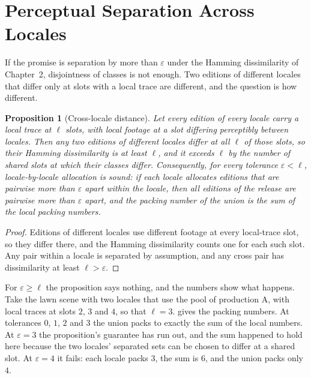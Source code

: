 \documentclass[11pt,twoside,openright]{book}
\theoremstyle{plain}
\newtheorem{proposition}[theorem]{Proposition}
\theoremstyle{definition}
\theoremstyle{remark}
\begin{document}
\section{Perceptual Separation Across Locales}\label{sec:sep11}

If the promise is separation by more than $\varepsilon$ under the Hamming dissimilarity of Chapter~2, disjointness of classes is not enough. Two editions of different locales that differ only at slots with a local trace are different, and the question is how different.

\begin{proposition}[Cross-locale distance]\label{prop:cross}
Let every edition of every locale carry a local trace at $\ell$ slots, with local footage at a slot differing perceptibly between locales. Then any two editions of different locales differ at all $\ell$ of those slots, so their Hamming dissimilarity is at least $\ell$, and it exceeds $\ell$ by the number of shared slots at which their classes differ. Consequently, for every tolerance $\varepsilon<\ell$, locale-by-locale allocation is sound: if each locale allocates editions that are pairwise more than $\varepsilon$ apart within the locale, then all editions of the release are pairwise more than $\varepsilon$ apart, and the packing number of the union is the sum of the local packing numbers.
\end{proposition}

\begin{proof}
Editions of different locales use different footage at every local-trace slot, so they differ there, and the Hamming dissimilarity counts one for each such slot. Any pair within a locale is separated by assumption, and any cross pair has dissimilarity at least $\ell>\varepsilon$.
\end{proof}

For $\varepsilon\ge\ell$ the proposition says nothing, and the numbers show what happens. Take the lawn scene with two locales that use the pool of production A, with local traces at slots $2$, $3$ and $4$, so that $\ell=3$.  gives the packing numbers. At tolerances $0$, $1$, $2$ and $3$ the union packs to exactly the sum of the local numbers. At $\varepsilon=3$ the proposition's guarantee has run out, and the sum happened to hold here because the two locales' separated sets can be chosen to differ at a shared slot. At $\varepsilon=4$ it fails: each locale packs $3$, the sum is $6$, and the union packs only $4$.
\end{document}
